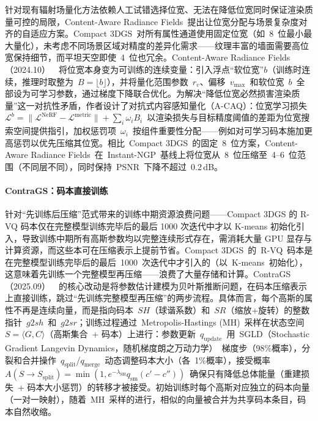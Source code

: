 针对现有辐射场量化方法依赖人工试错选择位宽、无法在降低位宽同时保证渲染质量可控的局限，Content-Aware Radiance Fields~提出让位宽分配与场景复杂度对齐的自适应方案。Compact 3DGS~对所有属性通道使用固定位宽（如~8~位最小最大量化），未考虑不同场景区域对精度的差异化需求——纹理丰富的墙面需要高位宽保持细节，而平坦天空即使~4~位也冗余。Content-Aware Radiance Fields（2024.10）~\cite{2410_19483}~将位宽本身变为可训练的连续变量：引入浮点``软位宽''$b$（训练时连续，推理时取整为~$B = \lfloor b \rfloor$），并将量化范围参数~$r_v$、偏移~$v_\text{max}$~和软位宽~$b$~全部设为可学习参数，通过梯度下降联合优化。为解决``降低位宽必然损害渲染质量''这一对抗性矛盾，作者设计了对抗式内容感知量化（A-CAQ）：位宽学习损失~$\mathcal{L}^b = \| \mathcal{L}^\text{NeRF} - \mathcal{L}^\text{metric} \| + \sum_i \omega_i B_i$~以渲染损失与目标精度阈值的差距为位宽搜索空间提供指引，加权惩罚项~$\omega_i$~按组件重要性分配——例如对可学习码本施加更高惩罚以优先压缩其位宽。相比~Compact 3DGS~的固定~8~位方案，Content-Aware Radiance Fields~在~Instant-NGP~基线上将位宽从~8~位压缩至~4--6~位范围（不同层不同），同时保持~PSNR~下降不超过~0.2\,dB。

\paragraph{ContraGS：码本直接训练} 针对``先训练后压缩''范式带来的训练中期资源浪费问题——Compact 3DGS 的 R-VQ 码本仅在完整模型训练完毕后的最后 1000 次迭代中才以 K-means 初始化引入，导致训练中期所有高斯参数均以完整连续形式存在，需消耗大量 GPU 显存与计算资源，而这些本可在压缩表示上提前节省。Compact 3DGS~的~R-VQ~码本是在完整模型训练完毕后的最后~1000~次迭代中才引入的（以~K-means~初始化），这意味着先训练一个完整模型再压缩——浪费了大量存储和计算。ContraGS（2025.09）~\cite{2509_03775}~的核心改动是将参数估计建模为贝叶斯推断问题，在码本压缩表示上直接训练，跳过``先训练完整模型再压缩''的两步流程。具体而言，每个高斯的属性不再是连续向量，而是指向码本~$SH$（球谐系数）和~$SR$（缩放+旋转）的整数指针~$g2sh$~和~$g2sr$；训练过程通过~Metropolis-Hastings (MH)~采样在状态空间~$S = \langle G, C \rangle$（高斯集合~+ 码本）上进行：参数更新~$q_\text{update}$~用~SGLD（Stochastic Gradient Langevin Dynamics，随机梯度朗之万动力学）~梯度步（98\%概率），分裂和合并操作~$q_\text{split}$/$q_\text{merge}$~动态调整码本大小（各~1\%概率），接受概率~$A(S \to S_\text{split}) = \min(1, e^{-\lambda_\text{SH}} q_\text{sm}(c'-c''))$~确保只有降低总体能量（重建损失~+ 码本大小惩罚）的转移才被接受。初始训练时每个高斯对应独立的码本向量（一对一映射），随着~MH~采样的进行，相似的向量被合并为共享码本条目，码本自然收缩。

